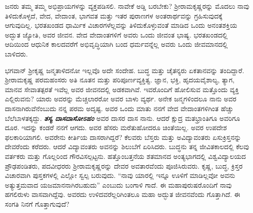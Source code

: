 ಜನರು ತಮ್ಮ ತಮ್ಮ ಅಭಿಪ್ರಾಯಗಳನ್ನು ವ್ಯಕ್ತಪಡಿಸಲಿ. ನಾವೇಕೆ ಅಡ್ಡಿ ಬರಬೇಕು? ಶ‍್ರೀರಾಮಕೃಷ್ಣರನ್ನು ಮೊದಲು ನಾವು ತಿಳಿದುಕೊಳ್ಳದೆ, ವೇದ, ವೇದಾಂತ, ಭಾಗವತ ಮತ್ತು ಇತರ ಪುರಾಣಗಳ ಅಂತರಾರ್ಥವನ್ನು ಗ್ರಹಿಸುವುದಕ್ಕೆ ಆಗುವುದಿಲ್ಲ. ಭರತಖಂಡದ ಧಾರ್ಮಿಕ ವಿಚಾರಗಳೆಲ್ಲವನ್ನು ತಿಳಿದುಕೊಳ್ಳುವಂತೆ ಮಾಡಿದ ಒಂದು ಅನಂತಶಕ್ತಿಯ ಅದ್ಭುತ ಜ್ಯೋತಿ, ಅವರ ಜೀವನ. ವೇದ ವೇದಾಂತಗಳಿಗೆ ಅವರು ಒಂದು ಜೀವಂತ ಭಾಷ್ಯ. ಭರತಖಂಡದಲ್ಲಿ ಆದಿಯಿಂದ ಆಧುನಿಕ ಕಾಲದವರೆಗೆ ಅಭಿವೃದ್ಧಿಯಾಗಿ ಬಂದ ಧರ್ಮವನ್ನೆಲ್ಲ ಅವರು ಒಂದು ಜೀವಮಾನದಲ್ಲಿ ಬಾಳಿದರು.

ಭಗವಾನ್ ಶ‍್ರೀಕೃಷ್ಣ ಜನ್ಮತಾಳಿದನೋ ಇಲ್ಲವೊ ಅದೇ ಸಂದೇಹ. ಬುದ್ಧ ಮತ್ತು ಚೈತನ್ಯರು ಏಕತಾನವನ್ನು ತಂದಿದ್ದಾರೆ. ಶ‍್ರೀರಾಮಕೃಷ್ಣ ಪರಮಹಂಸರು ಅತಿ ನೂತನ ಮತ್ತು ಪರಿಪೂರ್ಣವ್ಯಕ್ತಿತ್ವ. ಜ್ಞಾನ, ಭಕ್ತಿ, ಹೃದಯವೈಶಾಲ್ಯ, ತ್ಯಾಗ, ಮಾನವ ಸೇವಾತತ್ಪರತೆ ಇವೆಲ್ಲ ಅವರ ಜೀವನದಲ್ಲಿ ಅಡಕವಾಗಿವೆ. ಇವರೊಂದಿಗೆ ಹೋಲಿಸುವ ಮತ್ತೊಂದು ವ್ಯಕ್ತಿ ಎಲ್ಲಿರುವನು? ಯಾರು ಅವರನ್ನು ಮೆಚ್ಚಲಾರರೋ ಅವರ ಬಾಳು ವ್ಯರ್ಥ. ಅನೇಕ ಜನ್ಮಗಳಿಂದಲೂ ನಾನು ಅವರ ದಾಸನಾಗಿರುವೆನೆಂಬುದು ನನ್ನ ಪರಮ ಅದೃಷ್ಟ. ಅವರ ಒಂದು ಮಾತು ನನಗೆ ವೇದ ವೇದಾಂತಗಳಿಗಿಂತ ಹೆಚ್ಚು ಬೆಲೆಬಾಳತಕ್ಕದ್ದು. \textbf{\textit{ತಸ್ಯ ದಾಸದಾಸೋಽಹಂ}}\enginline{-} ಅವರ ದಾಸರ ದಾಸ ನಾನು. ಆದರೆ ಕ್ಷುದ್ರ ಮತಭ್ರಾಂತಿಗೂ ಅವರಿಗೂ ದೂರ. ಇದನ್ನು ಕಂಡರೆ ನನಗೆ ಆಗದು. ಅವರ ಹೆಸರು ಮರೆತುಹೋದರೂ ಚಿಂತೆಯಿಲ್ಲ. ಅವರ ಉಪದೇಶ ಫಲಕಾರಿಯಾಗಲಿ. ಅವರೇನು ಕೀರ್ತಿಯ ದಾಸರಾಗಿದ್ದರೆ? ಕೆಲವರು ಬೆಸ್ತರು ಮತ್ತು ಅವಿದ್ಯಾವಂತರು ಏಸುಕ್ರಿಸ್ತನನ್ನು ದೇವರೆಂದು ಕರೆದರು. ಆದರೆ ವಿದ್ಯಾವಂತರು ಅವನನ್ನು ಶಿಲುಬೆಗೆ ಏರಿಸಿದರು. ಬುದ್ಧನು ತನ್ನ ಜೀವಿತಕಾಲದಲ್ಲಿ ಕೆಲವು ವರ್ತಕರು ಮತ್ತು ಗೊಲ್ಲರಿಂದ ಗೌರವಿಸಲ್ಪಟ್ಟನು. ಹತ್ತೊಂಬತ್ತನೆಯ ಶತಮಾನದ ಅಂತ್ಯಭಾಗದಲ್ಲಿ ವಿಶ್ವವಿದ್ಯಾಲಯದ ಪ್ರೌಢಪಂಡಿತರು, ಪದವೀಧರರು ಶ‍್ರೀರಾಮಕೃಷ್ಣರನ್ನು ದೇವರ ಅವತಾರವೆಂದು ಪೂಜಿಸಿರುವರು. ಕೃಷ್ಣ, ಬುದ್ಧ, ಕ್ರಿಸ್ತರ ವಿಚಾರವಾಗಿ ಪುಸ್ತಕಗಳಲ್ಲಿ ಎಲ್ಲೋ ಸ್ವಲ್ಪ ಬರುವುದು. “ನಾವು ಯಾರಲ್ಲಿ ಇನ್ನೂ ಊಳಿಗೆ ಮಾಡಿಲ್ಲವೋ ಅವನು ಅತ್ಯುತ್ತಮವಾದ ಯಜಮಾನನಾಗಿರಬಹುದು” ಎಂಬುದು ಬಂಗಾಳಿ ಗಾದೆ. ಈ ಮಹಾಪುರುಷರೊಂದಿಗೆ ನಾವು ಹಗಲಿರುಳು ವಾಸವಾಗಿದ್ದೆವು. ಅವರದು ಉಳಿದವರೆಲ್ಲರಿಗಿಂತಲೂ ಮಹಾ ಅದ್ಭುತ ಜೀವನವೆಂದು ಗೊತ್ತಾಗಿದೆ. ಈ ಸಂಗತಿ ನಿನಗೆ ಗೊತ್ತಾಗುವುದೆ?

